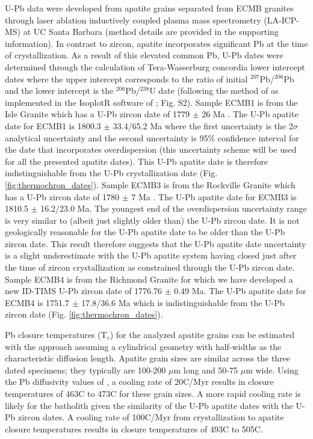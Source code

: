 \documentclass[draft]{agujournal2019}
\begin{document}
U-Pb data were developed from apatite grains separated from ECMB granites through laser ablation inductively coupled plasma mass spectrometry (LA-ICP-MS) at UC Santa Barbara (method details are provided in the supporting information). In contrast to zircon, apatite incorporates significant Pb at the time of crystallization. As a result of this elevated common Pb, U-Pb dates were determined through the calculation of Tera-Wasserburg concordia lower intercept dates where the upper intercept corresponds to the ratio of initial $^{207}$Pb/$^{206}$Pb and the lower intercept is the $^{206}$Pb/$^{238}$U date (following the method of  as implemented in the IsoplotR software of ; Fig. S2). Sample ECMB1 is from the Isle Granite which has a U-Pb zircon date of 1779 $\pm$ 26 Ma \cite{Holm2005a}. The U-Pb apatite date for ECMB1 is 1800.3 $\pm$ 33.4/65.2 Ma where the first uncertainty is the 2$\sigma$ analytical uncertainty and the second uncertainty is 95$\%$ confidence interval for the date that incorporates overdispersion (this uncertainty scheme will be used for all the presented apatite dates). This U-Pb apatite date is therefore indistinguishable from the U-Pb crystallization date (Fig. \ref{fig:thermochron_dates}). Sample ECMB3 is from the Rockville Granite which has a U-Pb zircon date of 1780 $\pm$ 7 Ma \cite{Holm2005a}. The U-Pb apatite date for ECMB3 is 1810.5 $\pm$ 16.2/23.0 Ma. The youngest end of the overdispersion uncertainty range is very similar to (albeit just slightly older than) the U-Pb zircon date. It is not geologically reasonable for the U-Pb apatite date to be older than the U-Pb zircon date. This result therefore suggests that the U-Pb apatite date uncertainty is a slight underestimate with the U-Pb apatite system having closed just after the time of zircon crystallization as constrained through the U-Pb zircon date.  Sample ECMB4 is from the Richmond Granite for which we have developed a new ID-TIMS U-Pb zircon date of 1776.76 $\pm$ 0.49 Ma. The U-Pb apatite date for ECMB4 is 1751.7 $\pm$ 17.8/36.6 Ma which is indistinguishable from the U-Pb zircon date (Fig. \ref{fig:thermochron_dates}).

Pb closure temperatures (T$_c$) for the analyzed apatite grains can be estimated with the  approach assuming a cylindrical geometry with half-widths as the characteristic diffusion length. Apatite grain sizes are similar across the three dated specimens; they typically are 100-200 $\mu$m long and 50-75 $\mu$m wide. Using the Pb diffusivity values of , a cooling rate of 20\textdegree C/Myr results in closure temperatures of 463\textdegree C to 473\textdegree C for these grain sizes. A more rapid cooling rate is likely for the batholith given the similarity of the U-Pb apatite dates with the U-Pb zircon dates. A cooling rate of 100\textdegree C/Myr from crystallization to apatite closure temperatures results in closure temperatures of 493\textdegree C to 505\textdegree C.
\end{document}
